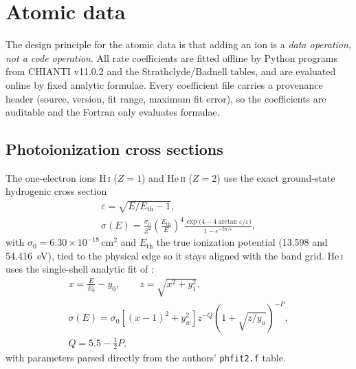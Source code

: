 \documentclass[twocolumn,linenumbers]{aastex702}
\newcommand{\code}[1]{\texttt{#1}}
\newcommand{\HI}{H\,\textsc{i}}
\newcommand{\HeI}{He\,\textsc{i}}
\newcommand{\HeII}{He\,\textsc{ii}}
\begin{document}
\section{Atomic data}
\label{sec:atomic}

The design principle for the atomic data is that adding an ion is a
\emph{data operation, not a code operation}.  All rate coefficients are
fitted offline by Python programs from CHIANTI v11.0.2
\citep{dere1997,delzanna_chianti} and the Strathclyde/Badnell tables, and
are evaluated online by fixed analytic formulae.  Every coefficient file
carries a provenance header (source, version, fit range, maximum fit
error), so the coefficients are auditable and the Fortran only evaluates
formulae.

\subsection{Photoionization cross sections}
\label{sec:xsec}

The one-electron ions \HI{} ($Z=1$) and \HeII{} ($Z=2$) use the exact
ground-state hydrogenic cross section \citep{osterbrock2006}
\begin{gather}
  \varepsilon = \sqrt{E/E_{\mathrm{th}}-1},
  \nonumber\\
  \sigma(E) = \frac{\sigma_0}{Z^2}\left(\frac{E_{\mathrm{th}}}{E}\right)^{4}
  \frac{\exp\!\big(4 - 4\arctan\varepsilon/\varepsilon\big)}
       {1 - e^{-2\pi/\varepsilon}},
  \label{eq:sighyd}
\end{gather}%
with $\sigma_0 = 6.30\times10^{-18}\,\mathrm{cm^2}$ and $E_{\mathrm{th}}$
the true ionization potential (13.598 and 54.416~eV), tied to the physical
edge so it stays aligned with the band grid.  \HeI{} uses the single-shell
analytic fit of \citet{verner1996}:
\begin{gather}
  x = \frac{E}{E_0} - y_0,\qquad z = \sqrt{x^2 + y_1^2},
  \nonumber\\
  \sigma(E) = \sigma_0\left[(x-1)^2 + y_w^2\right]
  z^{-Q}\left(1 + \sqrt{z/y_a}\right)^{-P},
  \nonumber\\
  Q = 5.5 - \tfrac{1}{2}P,
  \label{eq:vfky}
\end{gather}%
with parameters parsed directly from the authors' \code{phfit2.f} table.
\end{document}
